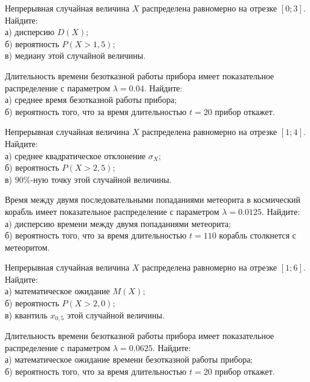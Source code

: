 \vfill

\newpage\setcounter{zad}{0}

\z Непрерывная случайная величина $X$ распределена равномерно на отрезке $[0; 3]$. Найдите: \\ \quad а) дисперсию $D(X)$; \\ \quad б) вероятность $P(X>1{,}5)$; \\ \quad в) медиану этой случайной величины.


\vfill

\z Длительность времени безотказной работы прибора имеет показательное распределение с параметром $\lambda = 0.04$. Найдите: \\ \quad а) среднее время безотказной работы прибора; \\ \quad б) вероятность того, что за время длительностью $t = 20$ прибор  откажет.
 

\vfill

\newpage\setcounter{zad}{0}

\z Непрерывная случайная величина $X$ распределена равномерно на отрезке $[1; 4]$. Найдите: \\ \quad а) среднее квадратическое отклонение $\sigma_X$; \\ \quad б) вероятность $P(X>2{,}5)$; \\ \quad в) $90\%$-ную точку этой случайной величины.


\vfill

\z Время между двумя последовательными попаданиями метеорита в космический корабль имеет показательное распределение с параметром $\lambda = 0.0125$. Найдите: \\ \quad а) дисперсию времени между двумя попаданиями метеорита; \\ \quad б) вероятность того, что за время длительностью $t = 110$ корабль  столкнется с метеоритом.
 

\vfill

\newpage\setcounter{zad}{0}

\z Непрерывная случайная величина $X$ распределена равномерно на отрезке $[1; 6]$. Найдите: \\ \quad а) математическое ожидание $M(X)$; \\ \quad б) вероятность $P(X>2{,}0)$; \\ \quad в) квантиль $x_{0{,}5}$ этой случайной величины.


\vfill

\z Длительность времени безотказной работы прибора имеет показательное распределение с параметром $\lambda = 0.0625$. Найдите: \\ \quad а) математическое ожидание времени безотказной работы прибора; \\ \quad б) вероятность того, что за время длительностью $t = 20$ прибор  откажет.
 

